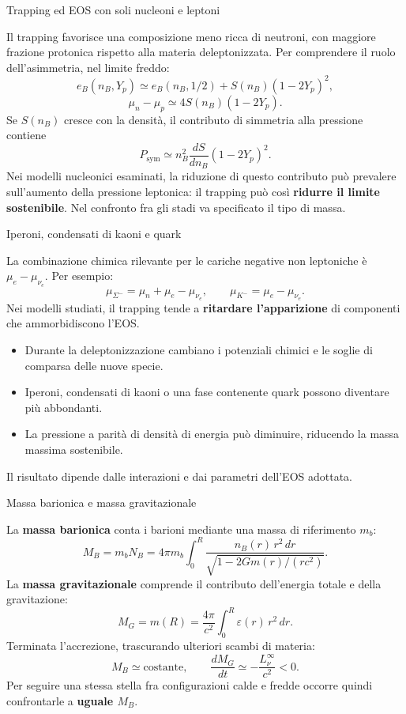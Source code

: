 \begin{frame}[t,label=pns-completa-12]{Trapping ed EOS con soli nucleoni e leptoni}
\small\raggedright
Il trapping favorisce una composizione meno ricca di neutroni,
con maggiore frazione protonica rispetto alla materia
deleptonizzata.
Per comprendere il ruolo dell'asimmetria, nel limite freddo:
\[
 e_B(n_B,Y_p)\simeq e_B(n_B,1/2)
 +S(n_B)(1-2Y_p)^2,
\]
\[
 \mu_n-\mu_p\simeq4S(n_B)(1-2Y_p).
\]
Se $S(n_B)$ cresce con la densit\`a, il contributo di simmetria
alla pressione contiene
\[
 P_{\mathrm{sym}}\simeq
 n_B^2\frac{dS}{dn_B}(1-2Y_p)^2.
\]
Nei modelli nucleonici esaminati, la riduzione di questo
contributo pu\`o prevalere sull'aumento della pressione leptonica:
il trapping pu\`o cos\`i \textbf{ridurre il limite sostenibile}.
Nel confronto fra gli stadi va specificato il tipo di massa.
\end{frame}

\begin{frame}[t,label=pns-completa-13]{Iperoni, condensati di kaoni e quark}
\small\raggedright
La combinazione chimica rilevante per le cariche negative
non leptoniche \`e $\mu_e-\mu_{\nu_e}$. Per esempio:
\[
 \mu_{\Sigma^-}=\mu_n+\mu_e-\mu_{\nu_e},
 \qquad\mu_{K^-}=\mu_e-\mu_{\nu_e}.
\]
Nei modelli studiati, il trapping tende a
\textbf{ritardare l'apparizione} di componenti che
ammorbidiscono l'EOS.
\begin{itemize}
 \item Durante la deleptonizzazione cambiano i potenziali
 chimici e le soglie di comparsa delle nuove specie.
 \item Iperoni, condensati di kaoni o una fase contenente quark
 possono diventare pi\`u abbondanti.
 \item La pressione a parit\`a di densit\`a di energia
 pu\`o diminuire, riducendo la massa massima sostenibile.
\end{itemize}
Il risultato dipende dalle interazioni e dai parametri
dell'EOS adottata.
\end{frame}

\begin{frame}[t,label=pns-completa-14]{Massa barionica e massa gravitazionale}
\small\raggedright
La \textbf{massa barionica} conta i barioni mediante una massa
di riferimento $m_b$:
\[
 M_B=m_bN_B
 =4\pi m_b\int_0^R
 \frac{n_B(r)\,r^2\,dr}{\sqrt{1-2Gm(r)/(rc^2)}}.
\]
La \textbf{massa gravitazionale} comprende il contributo
dell'energia totale e della gravitazione:
\[
 M_G=m(R)=\frac{4\pi}{c^2}
 \int_0^R\varepsilon(r)\,r^2\,dr.
\]
Terminata l'accrezione, trascurando ulteriori scambi di materia:
\[
 \boxed{M_B\simeq\mathrm{costante}},
 \qquad\boxed{\frac{dM_G}{dt}\simeq-\frac{L_\nu^\infty}{c^2}<0}.
\]
Per seguire una stessa stella fra configurazioni calde e fredde
occorre quindi confrontarle a \textbf{uguale $M_B$}.
\end{frame}


